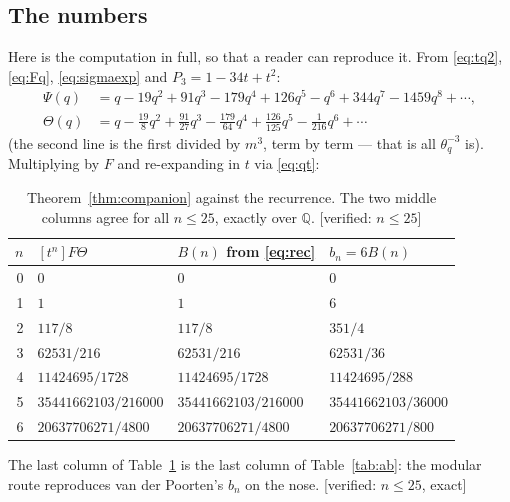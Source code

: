 \documentclass[11pt,reqno]{amsart}
\theoremstyle{plain}
\theoremstyle{definition}
\theoremstyle{remark}
\newcommand{\Q}{\mathbb{Q}}
\newcommand{\Ver}[1]{\textup{\textsf{[verified: #1]}}}
\newcommand{\tq}{\theta_q}
\numberwithin{equation}{section}
\begin{document}
\subsection*{The numbers}

Here is the computation in full, so that a reader can reproduce it.
From \eqref{eq:tq2}, \eqref{eq:Fq}, \eqref{eq:sigmaexp} and $P_3=1-34t+t^2$:
\begin{align}
  \Psi(q)&=q-19q^2+91q^3-179q^4+126q^5-q^6+344q^7-1459q^8+\cdots,
    \label{eq:Psiexp}\\
  \Theta(q)&=q-\tfrac{19}{8}q^2+\tfrac{91}{27}q^3-\tfrac{179}{64}q^4
             +\tfrac{126}{125}q^5-\tfrac{1}{216}q^6+\cdots
    \label{eq:Thetaexp}
\end{align}
(the second line is the first divided by $m^3$, term by term --- that is all
$\tq^{-3}$ is). Multiplying by $F$ and re-expanding in $t$ via \eqref{eq:qt}:

\begin{table}[ht]
\centering
\begin{tabular}{@{}rlll@{}}
\toprule
$n$ & $[t^n]F\Theta$ & $B(n)$ from \eqref{eq:rec} & $b_n=6B(n)$\\
\midrule
0 & $0$ & $0$ & $0$\\
1 & $1$ & $1$ & $6$\\
2 & $117/8$ & $117/8$ & $351/4$\\
3 & $62531/216$ & $62531/216$ & $62531/36$\\
4 & $11424695/1728$ & $11424695/1728$ & $11424695/288$\\
5 & $35441662103/216000$ & $35441662103/216000$ & $35441662103/36000$\\
6 & $20637706271/4800$ & $20637706271/4800$ & $20637706271/800$\\
\bottomrule
\end{tabular}
\medskip
\caption{Theorem~\ref{thm:companion} against the recurrence.  The two middle
columns agree for all $n\le25$, exactly over $\Q$. \Ver{$n\le25$}}
\label{tab:companion}
\end{table}

\noindent The last column of Table~\ref{tab:companion} is the last column of
Table~\ref{tab:ab}: the modular route reproduces van der Poorten's $b_n$ on the
nose. \Ver{$n\le25$, exact}
\end{document}
